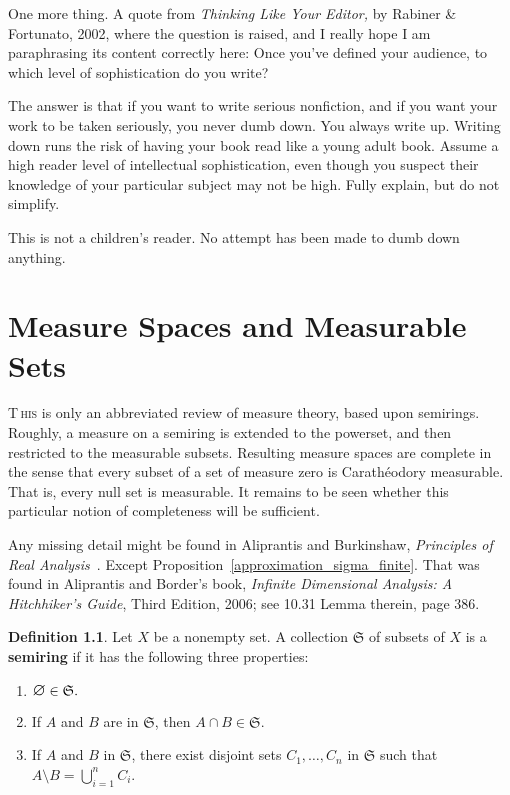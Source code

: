 \documentclass[
twoside=true,
paper=letter,
fontsize=9pt,
pagesize=auto,
leqno,
openany,
headsepline,
overfullrule,
]{scrbook}
\theoremstyle{plain}
\theoremstyle{plain}
\theoremstyle{definition}
\newtheorem{defn}[thm]{Definition}
\theoremstyle{bfnoteitalic}
\theoremstyle{bfnoteroman}
\newcommand{\sigalg}[1]{\mathfrak{#1}}
\newcommand{\mtset}{\hbox{\large{$\varnothing$}}}
\newcommand{\meets}{\cap}
\newcommand{\semiring}{\sigalg{S}}
\newcommand{\measurespace}{X}
\begin{document}
One more thing.
A quote from \textsl{Thinking Like Your Editor,} by Rabiner \& Fortunato, 2002, where the question is raised, and I really hope I am paraphrasing its content correctly here: Once you've defined your audience, to which level of sophistication do you write?
\begin{quoting}\small
The answer is that if you want to write serious nonfiction, and if you want your work to be taken seriously, you never dumb down. You always write up. Writing down runs the risk of having your book read like a young adult book. Assume a high reader level of intellectual sophistication, even though you suspect their knowledge of your particular subject may not be high.  Fully explain, but do not simplify.
\end{quoting}
This is not a children's reader.
No attempt has been made to dumb down anything.





\chapter{Measure Spaces and Measurable Sets}
\lettrine{T}{\,his} is only an abbreviated review of measure theory, based upon semirings.
Roughly, a measure on a semiring is extended to the powerset, and then restricted to the measurable subsets.  Resulting measure spaces are complete in the sense that every subset of a set of measure zero is 
Carath\'{e}odory measurable. That is, every null set is measurable.
It remains to be seen whether this particular notion of completeness will be sufficient.


Any missing detail might be found in  Aliprantis and Burkinshaw, \textsl{Principles of Real Analysis}~\cite{pora_aliprantis_1990}. Except Proposition~\ref{approximation_sigma_finite}. That was found in Aliprantis and Border's book, \textsl{Infinite Dimensional Analysis: A Hitchhiker's Guide}, Third Edition, 2006; see 10.31 Lemma therein, page 386.

\begin{defn}
Let $\measurespace$ be a nonempty set.  A collection $\semiring$ of subsets of $\measurespace$ is a \textbf{semiring} if it has the following three properties:
\begin{enumerate} %
\item $\mtset\in\semiring.$
\item If $A$ and $B$ are in $\semiring$, then $A\meets B\in\semiring$. 
\item If  $A$ and $B$ in $\semiring$, there exist disjoint sets $C_1, \ldots , C_n$ in $\semiring$ such that $A\setminus B =\bigcup_{i=1}^{n}C_i$.
\end{enumerate}
\end{defn}
\end{document}
